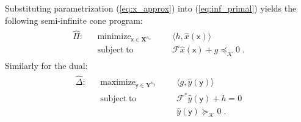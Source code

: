\documentclass{article}
\DeclareMathOperator*{\minimize}{minimize}
\DeclareMathOperator*{\maximize}{maximize}
\DeclareMathOperator*{\subj}{subject\;to}
\newcommand{\ppar}{\theta}                          %
\newcommand{\Ppar}{{\bm{\theta}}}                   %
\newcommand{\X}{\mathbf{X}}                         %
\newcommand{\Y}{\mathbf{Y}}                         %
\newcommand{\K}{\mathbf{K}}                         %
\newcommand{\calF}{\mathcal{F}}                     %
\newcommand{\Ym}{{\bm{\mathcal{Y}}_{\Ppar}}}        %
\newcommand{\Km}{{\bm{\mathcal{K}}}}                %
\newcommand{\cx}{\textsf{x}}        %
\newcommand{\nx}{{n_x}}             %
\newcommand{\cy}{\textsf{y}}        %
\newcommand{\ny}{{n_y}}             %
\begin{document}
Substituting parametrization (\ref{eq:x_approx}) into (\ref{eq:inf_primal}) yields the following semi-infinite cone program:
\begin{gather}\label{eq:semi-inf_primal}
\begin{aligned}
\hat{\Pi}: && \minimize_{\cx\in\X^\nx} &&& \langle h, \hat{x}(\cx) \rangle  \\%
           && \subj                    &&& \calF \hat{x}(\cx) + g \preceq_\Km 0 \;.%
\end{aligned}
\end{gather}
Similarly for the dual:
\begin{gather}\label{eq:semi-inf_dual}
\begin{aligned}
\hat{\Delta}: && \maximize_{\cy\in\Y^\ny} &&& \langle g , \hat{y}(\cy) \rangle \\%
              && \subj                    &&& \calF^* \hat{y}(\cy) + h = 0 \\%
              &&                          &&& \hat{y}(\cy) \succeq_\Km 0\;.%
\end{aligned}
\end{gather}
\end{document}
